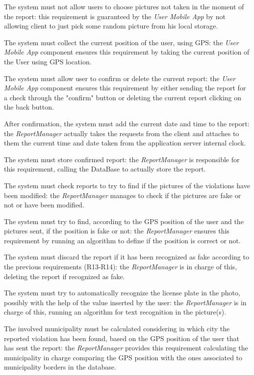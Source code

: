 \documentclass[a4paper]{report}
\begin{document}
\begin{enumerate}[start=1,label={[R\arabic*]}]
\item \label{[R8]}The system must not allow users to choose pictures not taken in the moment of the report: this requirement is guaranteed by the \textit{User Mobile App} by not allowing client to just pick some random picture from his local storage.
\item \label{[R9]}The system must collect the current position of the user, using GPS: the \textit{User Mobile App} component ensures this requirement by taking the current position of the User using GPS location.
\item \label{[R10]}The system must allow user to confirm or delete the current report: the \textit{User Mobile App} component ensures this requirement by either sending the report for a check through the "confirm" button or deleting the current report clicking on the back button.
\item\label{[R11]} After confirmation, the system must add the current date and time to the report: the \textit{ReportManager} actually takes the requests from the client and attaches to them the current time and date taken from the application server internal clock.
\item \label{[R12]}The system must store confirmed report: the \textit{ReportManager} is responsible for this requirement, calling the DataBase to actually store the report.
\item \label{[R13]}The system must check reports to try to find if the pictures of the violations have been modified: the \textit{ReportManager} manages to check if the pictures are fake or not or have been modified.
\item \label{[R14]}The system must try to find, according to the GPS position of the user and the pictures sent, if the position is fake or not: the \textit{ReportManager} ensures this requirement by running an algorithm to define if the position is correct or not. 
\item \label{[R15]}The system must discard the report if it has been recognized as fake according to the previous requirements (R13-R14): the \textit{ReportManager} is in charge of this, deleting the report if recognized as fake.
\item \label{[R16]}The system must try to automatically recognize the license plate in the photo, possibly with the help of the value inserted by the user: the \textit{ReportManager} is in charge of this, running an algorithm for text recognition in the picture(s).
\item \label{[R17]}The involved municipality must be calculated considering in which city the reported violation has been found, based on the GPS position of the user that has sent the report: the \textit{ReportManager} provides this requirement calculating the municipality in charge comparing the GPS position with the ones associated to municipality borders in the database.

\end{enumerate}
\end{document}

